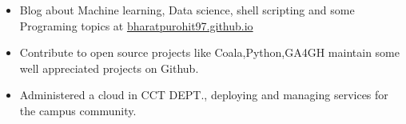 \vspace{-0.2cm}


{\fontsize{11pt}{1em}\bodyfontlight\upshape\color{text}
\begin{itemize}
  \itemsep-0.3em
  \item Blog about Machine learning, Data science, shell scripting and some Programing topics at \href{https://bharatpurohit97.github.io}{bharatpurohit97.github.io}
  \item Contribute to open source projects like Coala,Python,GA4GH maintain some well appreciated
    projects on Github.
  \item Administered a cloud in CCT DEPT., deploying and managing services for the campus community.
\end{itemize}
}

